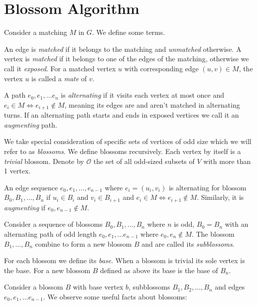 \section{Blossom Algorithm}

Consider a matching $M$ in $G$. We define some terms.

An edge is \textit{matched} if it belongs to the matching and \textit{unmatched} otherwise. 
A vertex is \textit{matched} if it belongs to one of the edges of the matching, otherwise we call it \textit{exposed}. 
For a matched vertex $u$ with corresponding edge $(u, v) \in M$, the vertex $u$ is called a \textit{mate} of $v$.

A path $e_0, e_1, \dots e_n$ is \textit{alternating} if it visits each vertex at most once and $e_i \in M \Leftrightarrow e_{i+1} \notin M$, meaning its edges are and aren't matched in alternating turns.  If an alternating path starts and ends in exposed vertices we call it an \textit{augmenting} path.

We take special consideration of specific sets of vertices of odd size which we will refer to as \textit{blossoms}. We define blossoms recursively. Each vertex by itself is a \textit{trivial} blossom. Denote by $\mathcal{O}$ the set of all odd-sized subsets of $V$ with more than 1 vertex.

An edge sequence $e_0, e_1, \dots, e_{n-1}$ where $e_i=(u_i, v_i)$ is alternating for blossom $B_0, B_1, \dots, B_n$ if $u_i \in B_i$ and $v_i \in B_{i+1}$ and $e_i \in M \Leftrightarrow e_{i+1} \notin M$. Similarly, it is \textit{augmenting} if $e_0, e_{n-1} \notin M$.

Consider a sequence of blossoms $B_0, B_1, \dots, B_n$ where $n$ is odd, $B_0 = B_n$ with an alternating path of odd length $e_0, e_1, \dots e_{n-1}$ where $e_0, e_n \notin M$. The blossom $B_1, \dots, B_n$ combine to form a new blossom $B$ and are called its \textit{subblossoms}.

For each blossom we define its \textit{base}. When a blossom is trivial its sole vertex is the base. For a new blossom $B$ defined as above its base is the base of $B_n$.

Consider a blossom $B$ with base vertex $b$, subblossoms $B_1, B_2, \dots, B_n$ and edges $e_0, e_1, \dots e_{n-1}$. We observe some useful facts about blossoms:

